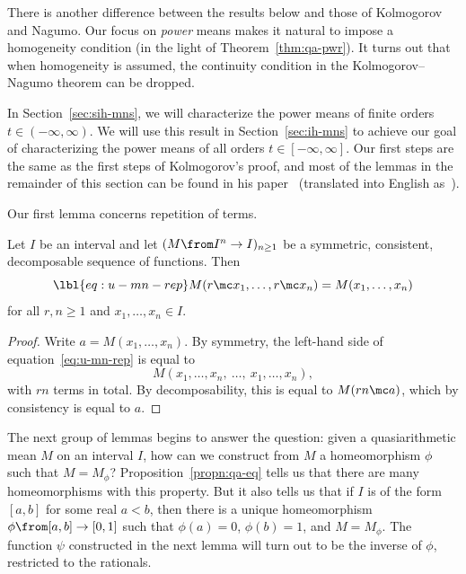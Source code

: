 There is another difference between the results below and those of
Kolmogorov and Nagumo.  Our focus on \emph{power} means makes it natural to
impose a homogeneity condition (in the light of Theorem~\ref{thm:qa-pwr}).
It turns out that when homogeneity is assumed, the continuity condition in
the Kolmogorov--Nagumo theorem can be dropped.

In Section~\ref{sec:sih-mns}, we will characterize the power means of
finite orders $t \in (-\infty, \infty)$.  We will use this result in
Section~\ref{sec:ih-mns} to achieve our goal of characterizing the power
means of all orders $t \in [-\infty, \infty]$.  Our first steps are the same as the first steps of Kolmogorov's%
%
% 
proof, and most of the lemmas in the remainder of this section
can be found in his paper~\cite{KolmSNM} (translated into English
as~\cite{KolmONM}).

Our first lemma concerns repetition of terms.

\begin{lemma}
Let $I$ be an interval and let $(M \from I^n \to I)_{n \geq 1}$ be a
symmetric, consistent, decomposable sequence of functions.  Then
% 
\begin{equation}
\lbl{eq:u-mn-rep}
M(r \mc x_1, \ldots, r \mc x_n)
=
M(x_1, \ldots, x_n)
\end{equation}
% 
for all $r, n \geq 1$ and $x_1, \ldots, x_n \in I$.
\end{lemma}

\begin{proof}
Write $a = M(x_1, \ldots, x_n)$.  By symmetry, the left-hand side of
equation~\eqref{eq:u-mn-rep} is equal to
\[
M(x_1, \ldots, x_n, \ \ldots, \ x_1, \ldots, x_n),
\]
with $rn$ terms in total.  By decomposability, this is equal to $M(rn \mc
a)$, which by consistency is equal to $a$.
\end{proof}

The next group of lemmas begins to answer the question: given a
quasiarithmetic mean $M$ on an interval $I$, how can we construct from $M$
a homeomorphism $\phi$ such that $M = M_\phi$?
Proposition~\ref{propn:qa-eq} tells us that there are many homeomorphisms
with this property.  But it also tells us that if $I$ is of the form $[a,
  b]$ for some real $a < b$, then there is a unique homeomorphism $\phi
\from [a, b] \to [0, 1]$ such that $\phi(a) = 0$, $\phi(b) = 1$, and $M =
M_\phi$.  The function $\psi$ constructed in the next lemma will turn out
to be the inverse of $\phi$, restricted to the rationals.

